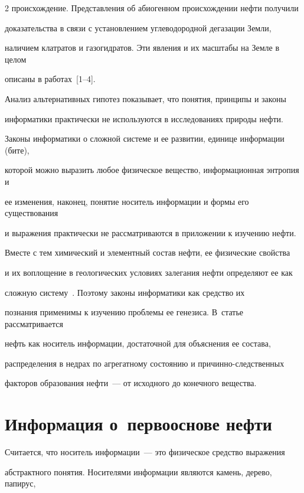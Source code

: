 \begin{multicols}{2}
происхождение. Пред\-став\-ле\-ния об абиогенном происхождении нефти получили 

доказательства в связи с установлением углеводородной дегазации Земли, 

наличием клатратов и газогидратов. Эти явления и их масштабы на Земле в целом 

описаны в работах~[1--4].

     

     Анализ альтернативных гипотез показывает, что понятия, принципы и законы 

информатики практически не используются в исследованиях природы нефти. 

Законы информатики о сложной системе и ее развитии, единице информации (бите), 

которой можно выразить любое физическое вещество, информационная энтропия и 

ее изменения, наконец, понятие носитель информации и формы его существования 

и выражения практически не рассматриваются в приложении к изучению нефти. 

     

     Вместе с тем химический и элементный состав нефти, ее физические свойства 

и их воплощение в геологических условиях залегания нефти определяют ее как 

сложную систему~\cite{21s}. Поэтому законы информатики как средство их 

познания применимы к изучению проблемы ее генезиса. В~статье рас\-смат\-ри\-ва\-ет\-ся 

нефть как носитель информации, достаточной для объяснения ее состава, 

распределения в недрах по агрегатному состоянию и причинно-следственных 

факторов образования нефти~--- от исходного до конечного вещества.



\section{Информация о~первооснове нефти}

     

     Считается, что носитель информации~--- это физическое средство выражения 

абстрактного понятия. Носителями информации являются камень, дерево, папирус, 


\end{multicols}
